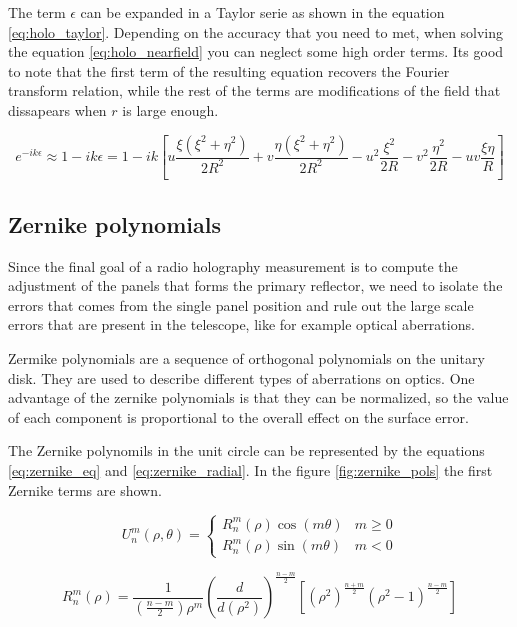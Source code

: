 The term $\epsilon$ can be expanded in a Taylor serie as shown in the equation \ref{eq:holo_taylor}. Depending on the accuracy that you need to met, when solving the equation \ref{eq:holo_nearfield} you can neglect some high order terms. Its good to note that the first term of the resulting equation recovers the Fourier transform relation, while the rest of the terms are modifications of the field that dissapears when $r$ is large enough.

\begin{equation}
    e^{-ik\epsilon} \approx 1-ik\epsilon = 1-ik\left[ u \frac{\xi(\xi^2+\eta^2)}{2R^2} + v \frac{\eta(\xi^2
+\eta^2)}{2R^2}-u^2\frac{\xi^2}{2R}-v^2\frac{\eta^2}{2R}-uv\frac{\xi\eta}{R} \right]
    \label{eq:holo_taylor}
\end{equation}



\subsection{Zernike polynomials}
Since the final goal of a radio holography measurement is to compute the adjustment of the panels that forms the primary reflector, we need to isolate the errors that comes from the single panel position and rule out the large scale errors that are present in the telescope, like for example optical aberrations. 


Zermike polynomials are a sequence of orthogonal polynomials on the unitary disk. They are used to describe different types of aberrations on optics. 
One advantage of the zernike polynomials is that they can be normalized, so the value of each component is proportional to the overall effect on the surface error.



The Zernike polynomils in the unit circle can be represented by the equations \ref{eq:zernike_eq} and \ref{eq:zernike_radial}. In the figure \ref{fig:zernike_pols} the first Zernike terms are shown.


\begin{equation}
    U_{n}^{m}(\rho, \theta) = \begin{cases}
        R_{n}^{m}(\rho)\cos(m \theta) & m \ge 0 \\
        R_{n}^{m}(\rho)\sin(m \theta) & m < 0
    \end{cases}
    \label{eq:zernike_eq}
\end{equation}

\begin{equation}
    R_{n}^{m}(\rho) = \frac{1}{\left(\frac{n-m}{2} \right) \rho^m} \left( \frac{d}{d(\rho^2)} \right)^{\frac{n-m}{2}} \left[ \left(\rho^2 \right)^{\frac{n+m}{2}} \left( \rho^2-1 \right)^{\frac{n-m}{2}} \right]
    \label{eq:zernike_radial}
\end{equation}




